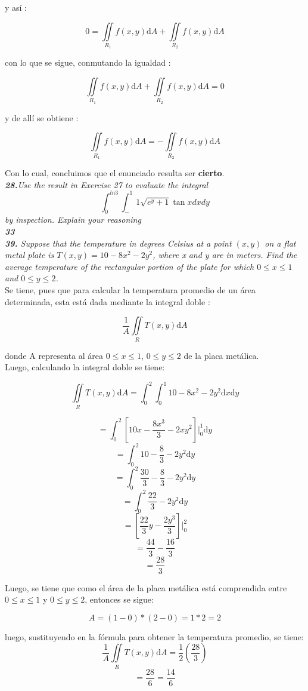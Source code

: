 \documentclass[a4paper,12pt]{article}
\begin{document}
	y así :

		$$ 0 = \iint\limits_{R_1} f(x,y)\mathrm{d}A + \iint\limits_{R_2} f(x,y)\mathrm{d}A  $$

	con lo que se sigue, conmutando la igualdad :

		$$ \iint\limits_{R_1} f(x,y)\mathrm{d}A + \iint\limits_{R_2} f(x,y)\mathrm{d}A = 0$$

	y de allí se obtiene :

		$$ \iint\limits_{R_1} f(x,y)\mathrm{d}A = - \iint\limits_{R_2} f(x,y)\mathrm{d}A $$

	Con lo cual, concluimos que el enunciado resulta ser \textbf{cierto}.\\

	\textit{\textbf{28.}Use the result in Exercise 27 to evaluate the integral
	\[\int^{ln 3}_{0} \int^1_-1 \sqrt{e^y + 1}\tan x dx dy\]
	by inspection. Explain your reasoning}\ \\

	\textit{\textbf{33}}\\

	\textit{\textbf{39.} Suppose that the temperature in degrees Celsius at a
	point $(x,y)$ on a flat metal plate is $ T(x,y)=10 - 8x^2 - 2y^2$, where x
	and y are in meters. Find the average temperature of the rectangular portion
	of the plate for which $0 \leq x \leq 1$ and $0 \leq y \leq 2$.}\\

	Se tiene, pues que para calcular la temperatura promedio de un área
	determinada, esta está dada mediante la integral doble :

		$$ \frac{1}{A}  \iint\limits_{R} T(x,y)\mathrm{d}A   $$

	donde A representa al área $ 0 \leq x \leq 1$, $ 0 \leq y \leq 2 $ de la
	placa metálica.\\

	Luego, calculando la integral doble se tiene:

		$$ \iint\limits_{R} T(x,y)\mathrm{d}A  =
			\int_{0}^{2} \int_{0}^{1} 10 - 8x^2 - 2y^2 \mathrm{d}x \mathrm{d}y   $$

		$$ = \int_{0}^{2} [ 10x - \frac{8x^3}{3} - 2xy^2 ] \Big|_0^1 \mathrm{d}y $$
		$$ = \int_{0}^{2} 10 - \frac{8}{3} - 2y^2  \mathrm{d}y $$
		$$ = \int_{0}^{2} \frac{30}{3} - \frac{8}{3} - 2y^2 \mathrm{d}y $$
		$$ = \int_{0}^{2} \frac{22}{3} - 2y^2 \mathrm{d}y $$
		$$ = [ \frac{22}{3}y - \frac{2y^3}{3} ] \Big|_0^2$$
		$$ = \frac{44}{3} - \frac{16}{3} $$
		$$ = \frac{28}{3} $$

	Luego, se tiene que como el área de la placa metálica está comprendida entre
	$ 0 \leq x \leq 1 $ y $ 0 \leq y \leq 2 $, entonces se sigue:

	 	$$ A = (1 - 0) * (2 - 0) = 1 * 2 = 2  $$

	luego, sustituyendo en la fórmula para obtener la temperatura promedio, se
	tiene:
		$$ \frac{1}{A}  \iint\limits_{R} T(x,y)\mathrm{d}A  = \frac{1}{2} (\frac{28}{3}) $$
		$$ = \frac{28}{6} = \frac{14}{6} $$
\end{document}
